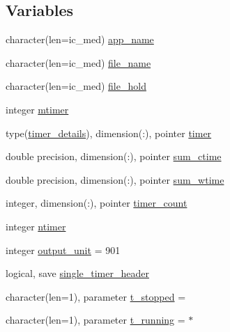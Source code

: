 \subsection*{Variables}
\begin{DoxyCompactItemize}
\item 
character(len=ic\+\_\+med) \hyperlink{namespacemod__oasis__timer_ad73dfe7213bbfab6212b9617000f4ce3}{app\+\_\+name}
\item 
character(len=ic\+\_\+med) \hyperlink{namespacemod__oasis__timer_a12dc3f95f8178d2ea46037a33da0e823}{file\+\_\+name}
\item 
character(len=ic\+\_\+med) \hyperlink{namespacemod__oasis__timer_a25a9f5f978c475475b48d782c4ad279c}{file\+\_\+hold}
\item 
integer \hyperlink{namespacemod__oasis__timer_acb04b78110e512ad551f7a500af70ef7}{mtimer}
\item 
type(\hyperlink{structmod__oasis__timer_1_1timer__details}{timer\+\_\+details}), dimension(\+:), pointer \hyperlink{namespacemod__oasis__timer_a8a4b64983bdf68b795ab2112bc02b8bc}{timer}
\item 
double precision, dimension(\+:), pointer \hyperlink{namespacemod__oasis__timer_a88e3c8171551da0ee64d10270484f6bf}{sum\+\_\+ctime}
\item 
double precision, dimension(\+:), pointer \hyperlink{namespacemod__oasis__timer_ab4d27b8be5c21939ab8d8e32d5582e9e}{sum\+\_\+wtime}
\item 
integer, dimension(\+:), pointer \hyperlink{namespacemod__oasis__timer_a225db1b2b8bd57f0567d37b5c4d00ca3}{timer\+\_\+count}
\item 
integer \hyperlink{namespacemod__oasis__timer_aa92116f5ed11fd498b11b37e368e7b72}{ntimer}
\item 
integer \hyperlink{namespacemod__oasis__timer_a80e0bc610eb9e9b0aa07e926d5a9fde8}{output\+\_\+unit} = 901
\item 
logical, save \hyperlink{namespacemod__oasis__timer_a3733877ab9fa9d07df0ff70f21cd08b0}{single\+\_\+timer\+\_\+header}
\item 
character(len=1), parameter \hyperlink{namespacemod__oasis__timer_aceca66a08f073eb12f2643edc7c400fe}{t\+\_\+stopped} = \textquotesingle{} \textquotesingle{}
\item 
character(len=1), parameter \hyperlink{namespacemod__oasis__timer_a110185cdca99e2889419692182b0440a}{t\+\_\+running} = \textquotesingle{}$\ast$\textquotesingle{}
\end{DoxyCompactItemize}


